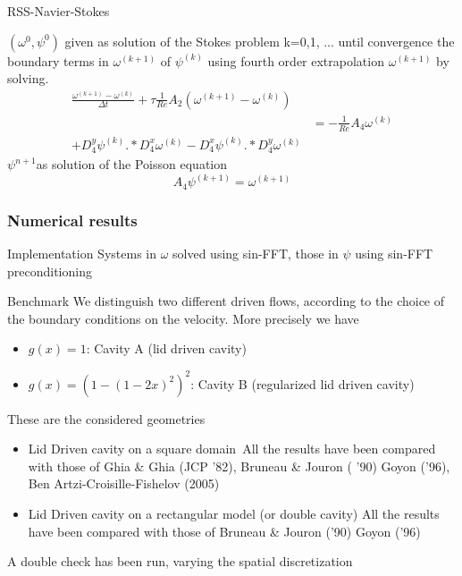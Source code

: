 \documentclass[hyperref={pdfpagemode=FullScreen},9pt]{beamer}
\newcommand{\Frac}[2] {\frac{\textstyle #1} {\textstyle #2}}
\begin{document}
 \begin{frame}
   \begin{center}
\begin{minipage}[H]{12cm}
  \begin{algorithm}[H]
    \caption{RSS-Navier-Stokes}\label{RSS-NSE}
    \begin{algorithmic}[1]
        \State  $(\omega^0, \psi^0)$ given as solution of the Stokes problem 
            \For  k=0,1, ... until convergence
               the boundary terms in $\omega^{(k+1)}$ of $\psi^{(k)}$ using  fourth order extrapolation %
                $\omega^{(k+1)}$ by solving. 
              $$ 
              \begin{array}{ll}
              \Frac{\omega^{(k+1)}-\omega^{(k)}}{\Delta t}+\tau \Frac{1}{Re}A_2(\omega^{(k+1)}-\omega^{(k)})&\\
              &=-\Frac{1}{Re}A_4  \omega^{(k)}\\

              +D_4^y\psi^{(k)}.*D_4^x\omega^{(k)} - D_4^x\psi^{(k)}.*D_4^y\omega^{(k)}       &
              \end{array}
              $$
                $\psi^{n+1}$as solution of the  Poisson equation %
               $$
               A_4\psi^{(k+1)}=\omega^{(k+1)}
               $$     
            \EndFor
    \end{algorithmic}
    \end{algorithm}
\end{minipage}
\end{center}

\end{frame}
\begin{frame}
\frametitle{Numerical results}
\begin{block}{Implementation}
Systems in $\omega$ solved using sin-FFT, those in $\psi$ using sin-FFT preconditioning
\end{block}
\begin{block}{Benchmark}
We distinguish two different driven flows, according to the choice of
the boundary conditions on the velocity. More precisely we have
\begin{itemize}
\item $g(x)=1$: Cavity A (lid driven cavity)
\item $g(x)=(1-(1-2x)^2)^2$: Cavity B (regularized lid driven cavity)
\end{itemize}
These are the considered geometries
\begin{itemize}
\item Lid Driven cavity on a square domain\
All the results have been compared with those of Ghia \& Ghia (JCP '82), Bruneau \& Jouron ( '90) Goyon ('96), Ben Artzi-Croisille-Fishelov  (2005)
\item Lid Driven cavity on a rectangular model (or double cavity)
All the results have been compared with those of Bruneau \& Jouron ('90) Goyon ('96)
\end{itemize}
A double check has been run, varying the spatial discretization
\end{block}
\end{frame}
\end{document}
